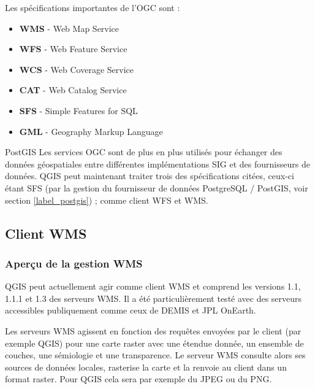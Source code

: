 Les sp\'ecifications importantes de l'OGC sont :

\begin{itemize}
\item \textbf{WMS} - Web Map Service
\item \textbf{WFS} - Web Feature Service
\item \textbf{WCS} - Web Coverage Service
\item \textbf{CAT} - Web Catalog Service
\item \textbf{SFS} - Simple Features for SQL
\item \textbf{GML} - Geography Markup Language
\end{itemize}

PostGIS
Les services OGC sont de plus en plus utilis\'es pour \'echanger des donn\'ees
g\'eospatiales entre diff\'erentes impl\'ementations SIG et des fournisseurs de
donn\'ees. QGIS peut maintenant traiter trois des sp\'ecifications cit\'ees, ceux-ci
\'etant SFS (par la gestion du fournisseur de donn\'ees PostgreSQL / PostGIS, voir
section \ref{label_postgis}) ; comme client WFS et WMS.

\subsection{Client
WMS}\label{sec:ogc-wms}

\subsubsection{Aper\c{c}u de la gestion
WMS}\label{sec:ogc-wms-about}

QGIS peut actuellement agir comme client WMS et comprend les versions 1.1, 1.1.1
et 1.3 des serveurs WMS. Il a \'et\'e particuli\`erement test\'e avec des serveurs
accessibles publiquement comme ceux de DEMIS et JPL OnEarth.

Les serveurs WMS agissent en fonction des requ\^etes envoy\'ees par le client (par
exemple QGIS) pour une carte raster avec une \'etendue donn\'ee, un ensemble de
couches, une s\'emiologie et une transparence. Le serveur WMS consulte alors ses
sources de donn\'ees locales, rasterise la carte et la renvoie au client dans un
format raster. Pour QGIS cela sera par exemple du JPEG ou du PNG.

